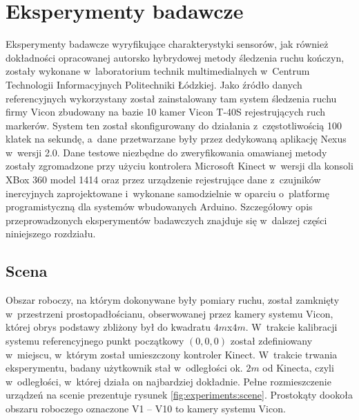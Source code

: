 \chapter{Eksperymenty badawcze}\label{chap:experiments}
Eksperymenty badawcze wyryfikujące charakterystyki sensorów, jak również dokładności opracowanej autorsko hybrydowej metody śledzenia ruchu kończyn, zostały wykonane w~laboratorium technik multimedialnych w~Centrum Technologii Informacyjnych Politechniki Łódzkiej. Jako źródło danych referencyjnych wykorzystany został zainstalowany tam system śledzenia ruchu firmy Vicon zbudowany na bazie 10 kamer Vicon T-40S  rejestrujących ruch markerów. System ten został skonfigurowany do działania z~częstotliwością 100 klatek na sekundę, a~dane przetwarzane były przez dedykowaną aplikację Nexus w~wersji 2.0. Dane testowe niezbędne do zweryfikowania omawianej metody zostały zgromadzone przy użyciu kontrolera Microsoft Kinect w~wersji dla konsoli XBox 360 model 1414 oraz przez urządzenie rejestrujące dane z~czujników inercyjnych zaprojektowane i~wykonane samodzielnie w oparciu o~platformę programistyczną dla systemów wbudowanych Arduino. Szczegółowy opis przeprowadzonych eksperymentów badawczych znajduje się w~dalszej części niniejszego rozdziału.

\section{Scena}
Obszar roboczy, na którym dokonywane były pomiary ruchu, został zamknięty w~przestrzeni prostopadłościanu, obserwowanej przez kamery systemu Vicon, której obrys podstawy zbliżony był do kwadratu $4m$x$4m$. W~trakcie kalibracji systemu referencyjnego punkt początkowy $\left(0, 0, 0\right)$ został zdefiniowany w~miejscu, w~którym został umieszczony kontroler Kinect. W~trakcie trwania eksperymentu, badany użytkownik stał w~odległości ok. $2m$ od Kinecta, czyli w~odległości, w~której działa on najbardziej dokładnie.  Pełne rozmieszczenie urządzeń na scenie prezentuje rysunek \ref{fig:experiments:scene}. Prostokąty dookoła obszaru roboczego oznaczone V1 -- V10 to kamery systemu Vicon.

